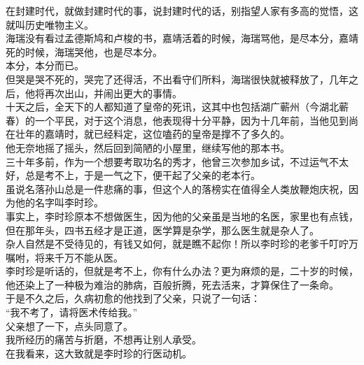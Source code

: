 \begin{multicols}{\theparacolNo}
在封建时代，就做封建时代的事，说封建时代的话，别指望人家有多高的觉悟，这就叫历史唯物主义。\\

海瑞没有看过孟德斯鸠和卢梭的书，嘉靖活着的时候，海瑞骂他，是尽本分，嘉靖死的时候，海瑞哭他，也是尽本分。\\

本分，本分而已。\\

但哭是哭不死的，哭完了还得活，不出看守们所料，海瑞很快就被释放了，几年之后，他将再次出山，并闹出更大的事情。\\

十天之后，全天下的人都知道了皇帝的死讯，这其中也包括湖广蕲州（今湖北蕲春）的一个平民，对于这个消息，他表现得十分平静，因为十几年前，当他见到尚在壮年的嘉靖时，就已经料定，这位嗑药的皇帝是撑不了多久的。\\

他无奈地摇了摇头，然后回到简陋的小屋里，继续写他的那本书。\\

三十年多前，作为一个想要考取功名的秀才，他曾三次参加乡试，不过运气不太好，总是考不上，于是一气之下，便干起了父亲的老本行。\\

虽说名落孙山总是一件悲痛的事，但这个人的落榜实在值得全人类放鞭炮庆祝，因为他的名字叫李时珍。\\

事实上，李时珍原本不想做医生，因为他的父亲虽是当地的名医，家里也有点钱，但在那年头，四书五经才是正道，医学算是杂学，那么医生就是杂人了。\\

杂人自然是不受待见的，有钱又如何，就是瞧不起你！所以李时珍的老爹千叮咛万嘱咐，将来千万不能从医。\\

李时珍是听话的，但就是考不上，你有什么办法？更为麻烦的是，二十岁的时候，他还染上了一种极为难治的肺病，百般折腾，死去活来，才算保住了一条命。\\

于是不久之后，久病初愈的他找到了父亲，只说了一句话：\\

“我不考了，请将医术传给我。”\\

父亲想了一下，点头同意了。\\

我所经历的痛苦与折磨，不想再让别人承受。\\

在我看来，这大致就是李时珍的行医动机。\\


\end{multicols}
